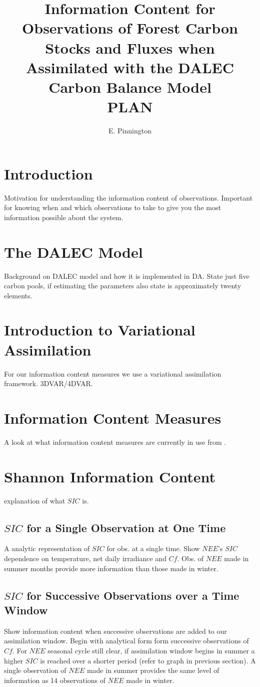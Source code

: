 \documentclass[11pt]{article}
\title{Information Content for Observations of Forest Carbon Stocks and Fluxes when Assimilated with the DALEC Carbon Balance Model \\ PLAN}
\author{\normalsize{E. Pinnington}}
\begin{document}
\maketitle

\section*{Introduction}
Motivation for understanding the information content of observations. Important for knowing when and which observations to take to give you the most information possible about the system.  \cite{baldocchi2008turner, fox2009reflex, richardson2010estimating}

\section*{The DALEC Model}
Background on DALEC model and how it is implemented in DA. State just five carbon pools, if estimating the parameters also state is approximately twenty elements.\cite{williams2005improved, delahaies2013regularization}

\section*{Introduction to Variational Assimilation}
For our information content measures we use a variational assimilation framework. 3DVAR/4DVAR. \cite{lewis2006dynamic}

\section*{Information Content Measures}
A look at what information content measures are currently in use from \cite{rodgers2000inverse, stewart2008correlated}.

\section*{Shannon Information Content}
explanation of what $SIC$ is. \cite{rodgers2000inverse, stewart2008correlated}
\subsection*{$SIC$ for a Single Observation at One Time}
A analytic representation of $SIC$ for obs. at a single time. Show $NEE$'s $SIC$ dependence on temperature, net daily irradiance and $Cf$. Obs. of $NEE$ made in summer months provide more information than those made in winter. 
\subsection*{$SIC$ for Successive Observations over a Time Window}
Show information content when successive observations are added to our assimilation window. Begin with analytical form form successive observations of $Cf$. For $NEE$ seasonal cycle still clear, if assimilation window begins in summer a higher $SIC$ is reached over a shorter period (refer to graph in previous section). A single observation of $NEE$ made in summer provides the same level of information as 14 observations of $NEE$ made in winter.
\end{document}
